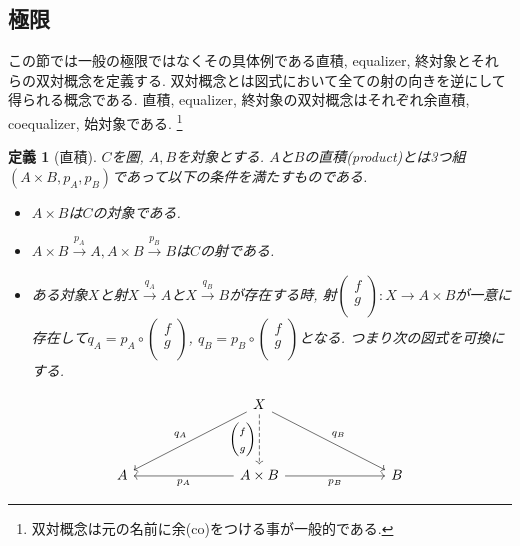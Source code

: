\documentclass[a4paper,12pt]{ltjsarticle}
\theoremstyle{break}
\newtheorem{defn}[thm]{定義}
\newcommand{\xr}[1]{\xrightarrow{#1}}
\newcommand{\ci}{\circ}
\newcommand{\ti}{\times}
\numberwithin{equation}{section}
\begin{document}
\subsection{極限}

この節では一般の極限ではなくその具体例である直積, equalizer, 終対象とそれらの双対概念を定義する. 
双対概念とは図式において全ての射の向きを逆にして得られる概念である. 
直積, equalizer, 終対象の双対概念はそれぞれ余直積, coequalizer, 始対象である.
\footnote{
  双対概念は元の名前に余(co)をつける事が一般的である.
  }

\begin{defn}[直積]
  $C$を圏, $A, B$を対象とする. 
  $A$と$B$の直積(product)とは3つ組$(A \ti B, p_A, p_B)$であって以下の条件を満たすものである.
  \begin{itemize} 
    \item $A \ti B$は$C$の対象である. 
    \item $A \ti B \xr{p_A} A, A \ti B \xr{p_B} B$は$C$の射である. 
    \item ある対象$X$と射$X \xr{q_A} A$と$X \xr{q_B} B$が存在する時, 射$\begin{pmatrix} f \\ g \\ \end{pmatrix}: X \to A \ti B$が一意に存在して$q_A = p_A \ci \begin{pmatrix} f \\ g \\ \end{pmatrix}$, $q_B = p_B \ci \begin{pmatrix} f \\ g \\ \end{pmatrix}$となる. 
    つまり次の図式を可換にする. 
  \end{itemize}   
  \[\begin{tikzcd}
	  &&& X \\
	  \\
	  A &&& {A \times B} &&& B
	  \arrow["{q_B}", from=1-4, to=3-7]
	  \arrow["{q_A}"', from=1-4, to=3-1]
	  \arrow["{\begin{pmatrix} f \\ g \\ \end{pmatrix}}"', dashed, from=1-4, to=3-4]
	  \arrow["{p_A}", from=3-4, to=3-1]
	  \arrow["{p_B}"', from=3-4, to=3-7]
  \end{tikzcd}\]
\end{defn}
\end{document}
